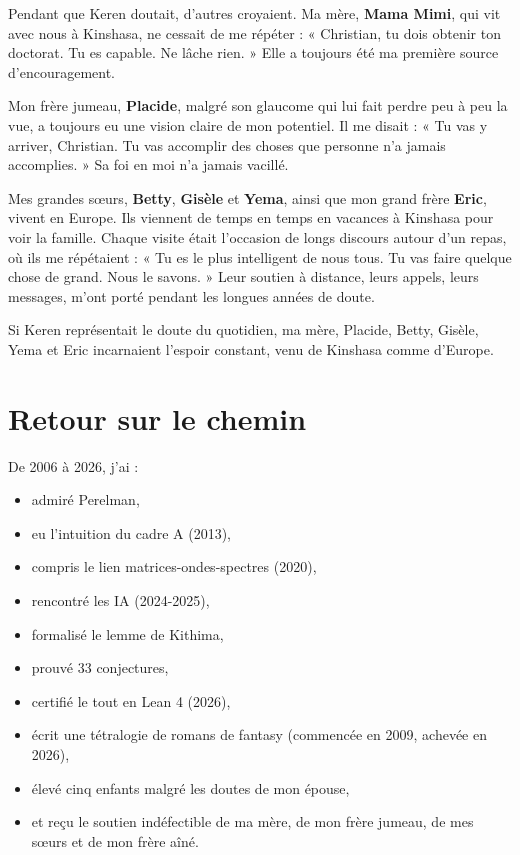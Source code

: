 \documentclass[11pt,a4paper]{article}
\begin{document}
Pendant que Keren doutait, d'autres croyaient. Ma mère, \textbf{Mama Mimi}, qui vit avec nous à Kinshasa, ne cessait de me répéter : « Christian, tu dois obtenir ton doctorat. Tu es capable. Ne lâche rien. » Elle a toujours été ma première source d'encouragement.

Mon frère jumeau, \textbf{Placide}, malgré son glaucome qui lui fait perdre peu à peu la vue, a toujours eu une vision claire de mon potentiel. Il me disait : « Tu vas y arriver, Christian. Tu vas accomplir des choses que personne n'a jamais accomplies. » Sa foi en moi n'a jamais vacillé.

Mes grandes sœurs, \textbf{Betty}, \textbf{Gisèle} et \textbf{Yema}, ainsi que mon grand frère \textbf{Eric}, vivent en Europe. Ils viennent de temps en temps en vacances à Kinshasa pour voir la famille. Chaque visite était l'occasion de longs discours autour d'un repas, où ils me répétaient : « Tu es le plus intelligent de nous tous. Tu vas faire quelque chose de grand. Nous le savons. » Leur soutien à distance, leurs appels, leurs messages, m'ont porté pendant les longues années de doute.

Si Keren représentait le doute du quotidien, ma mère, Placide, Betty, Gisèle, Yema et Eric incarnaient l'espoir constant, venu de Kinshasa comme d'Europe.

\section{Retour sur le chemin}

De 2006 à 2026, j'ai :
\begin{itemize}
\item admiré Perelman,
\item eu l'intuition du cadre A (2013),
\item compris le lien matrices-ondes-spectres (2020),
\item rencontré les IA (2024-2025),
\item formalisé le lemme de Kithima,
\item prouvé 33 conjectures,
\item certifié le tout en Lean 4 (2026),
\item écrit une tétralogie de romans de fantasy (commencée en 2009, achevée en 2026),
\item élevé cinq enfants malgré les doutes de mon épouse,
\item et reçu le soutien indéfectible de ma mère, de mon frère jumeau, de mes sœurs et de mon frère aîné.
\end{itemize}
\end{document}
